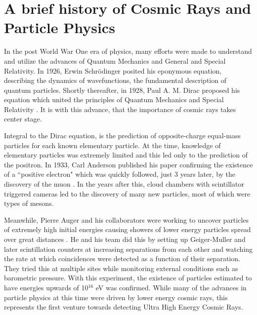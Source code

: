 \section{A brief history of Cosmic Rays and Particle Physics}
\label{history}
In the post World War One era of physics, many efforts were made to understand and utilize the advances of Quantum Mechanics and General and Special Relativity. In 1926, Erwin Schr{\"o}dinger posited his eponymous equation, describing the dynamics of wavefunctions, the fundamental description of quantum particles.  Shortly thereafter, in 1928, Paul A. M. Dirac proposed his equation which united the principles of Quantum Mechanics and Special Relativity \cite{dirac}. It is with this advance, that the importance of cosmic rays takes center stage.  

Integral to the Dirac equation, is the prediction of opposite-charge equal-mass particles for each known elementary particle. At the time, knowledge of elementary particles was extremely limited and this led only to the prediction of the positron. In 1933, Carl Anderson published his paper confirming the existence of a ``positive electron" which was quickly followed, just 3 years later, by the discovery of the muon \cite{positron,muon}. In the years after this, cloud chambers with scintillator triggered cameras led to the discovery of many new particles, most of which were types of mesons.  

Meanwhile, Pierre Auger and his collaborators were working to uncover particles of extremely high initial energies causing showers of lower energy particles spread over great distances \cite{firstshowers}. He and his team did this by setting up Geiger-Muller and later scintillation counters at increasing separations from each other and watching the rate at which coincidences were detected as a function of their separation. They tried this at multiple sites while monitoring external conditions such as barometric pressure. With this experiment, the existence of particles estimated to have energies upwards of 10$^{16}$ eV was confirmed. While many of the advances in particle physics at this time were driven by lower energy cosmic rays, this represents the first venture towards detecting Ultra High Energy Cosmic Rays. 
